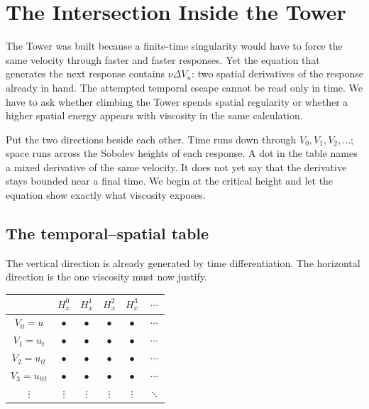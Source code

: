 \clearpage
\section{The Intersection Inside the Tower}\label{sec:TheIntersectionInsideTheTower}

The Tower was built because a finite-time singularity would have to force the
same velocity through faster and faster responses.  Yet the equation that
generates the next response contains \(\nu\Delta V_n\): two spatial
derivatives of the response already in hand.  The attempted temporal escape
cannot be read only in time.  We have to ask whether climbing the Tower spends
spatial regularity or whether a higher spatial energy appears with viscosity
in the same calculation.

Put the two directions beside each other.  Time runs down through
\(V_0,V_1,V_2,\ldots\); space runs across the Sobolev heights of each response.
A dot in the table names a mixed derivative of the same velocity.  It does not
yet say that the derivative stays bounded near a final time.  We begin at the
critical height and let the equation show exactly what viscosity exposes.

\subsection{The temporal--spatial table}\label{sub:TheTemporalSpatialTable}

The vertical direction is already generated by time differentiation.  The
horizontal direction is the one viscosity must now justify.

\begin{center}
\captionsetup{hypcap=false}
\label{tab:MixedDerivativeGrid}
\renewcommand{\arraystretch}{1.35}
\begin{tabular}{@{}c c c c c c@{}}
\toprule
& \(H^0_x\) & \(H^1_x\) & \(H^2_x\) & \(H^3_x\) & \(\cdots\) \\
\midrule
\(V_0=u\) & \(\bullet\) & \(\bullet\) & \(\bullet\) & \(\bullet\) & \(\cdots\) \\
\(V_1=u_t\) & \(\bullet\) & \(\bullet\) & \(\bullet\) & \(\bullet\) & \(\cdots\) \\
\(V_2=u_{tt}\) & \(\bullet\) & \(\bullet\) & \(\bullet\) & \(\bullet\) & \(\cdots\) \\
\(V_3=u_{ttt}\) & \(\bullet\) & \(\bullet\) & \(\bullet\) & \(\bullet\) & \(\cdots\) \\
\(\vdots\) & \(\vdots\) & \(\vdots\) & \(\vdots\) & \(\vdots\) & \(\ddots\) \\
\bottomrule
\end{tabular}
\end{center}




